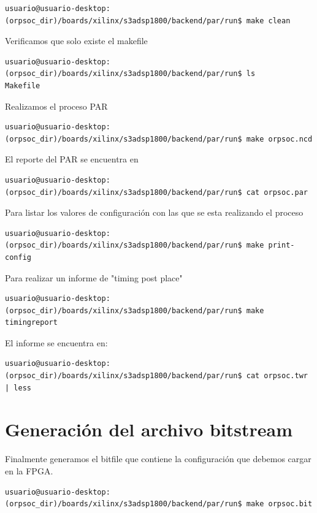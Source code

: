 \begin{lstlisting}[breaklines]
usuario@usuario-desktop:(orpsoc_dir)/boards/xilinx/s3adsp1800/backend/par/run$ make clean
\end{lstlisting}

Verificamos que solo existe el makefile
\begin{lstlisting}[breaklines]
usuario@usuario-desktop:(orpsoc_dir)/boards/xilinx/s3adsp1800/backend/par/run$ ls
Makefile
\end{lstlisting}

Realizamos el proceso PAR 

\begin{lstlisting}[breaklines]
usuario@usuario-desktop:(orpsoc_dir)/boards/xilinx/s3adsp1800/backend/par/run$ make orpsoc.ncd
\end{lstlisting}
El reporte del PAR se encuentra en 
\begin{lstlisting}[breaklines]
usuario@usuario-desktop:(orpsoc_dir)/boards/xilinx/s3adsp1800/backend/par/run$ cat orpsoc.par
\end{lstlisting}

Para listar los valores de configuración con las que se esta realizando el proceso
\begin{lstlisting}[breaklines]
usuario@usuario-desktop:(orpsoc_dir)/boards/xilinx/s3adsp1800/backend/par/run$ make print-config
\end{lstlisting}

Para realizar un informe de "timing post place" 

\begin{lstlisting}[breaklines]
usuario@usuario-desktop:(orpsoc_dir)/boards/xilinx/s3adsp1800/backend/par/run$ make timingreport
\end{lstlisting}

El informe se encuentra en:

\begin{lstlisting}[breaklines]
usuario@usuario-desktop:(orpsoc_dir)/boards/xilinx/s3adsp1800/backend/par/run$ cat orpsoc.twr | less
\end{lstlisting}


 \section{Generación del archivo bitstream}

Finalmente generamos el bitfile que contiene la configuración que debemos cargar en la FPGA.

\begin{lstlisting}[breaklines]
usuario@usuario-desktop:(orpsoc_dir)/boards/xilinx/s3adsp1800/backend/par/run$ make orpsoc.bit
\end{lstlisting}

